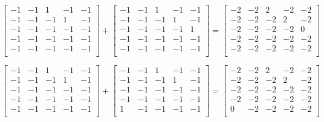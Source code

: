 \documentclass[IN,11pt,twoside,openright,bachelor,english]{tumthesis}
\begin{document}
\[
\begin{bmatrix}
-1 & -1 & 1 & -1 & -1 \\
-1 & -1 & -1 & 1 & -1 \\
-1 & -1 & -1 & -1 & -1 \\
-1 & -1 & -1 & -1 & -1 \\
-1 & -1 & -1 & -1 & -1 \\
\end{bmatrix}
+
\begin{bmatrix}
-1 & -1 & 1 & -1 & -1 \\
-1 & -1 & -1 & 1 & -1 \\
-1 & -1 & -1 & -1 & 1 \\
-1 & -1 & -1 & -1 & -1 \\
-1 & -1 & -1 & -1 & -1 \\
\end{bmatrix}
=
\begin{bmatrix}
-2 & -2 & 2 & -2 & -2 \\
-2 & -2 & -2 & 2 & -2 \\
-2 & -2 & -2 & -2 & 0 \\
-2 & -2 & -2 & -2 & -2 \\
-2 & -2 & -2 & -2 & -2 \\
\end{bmatrix}
\]




\[
\begin{bmatrix}
-1 & -1 & 1 & -1 & -1 \\
-1 & -1 & -1 & 1 & -1 \\
-1 & -1 & -1 & -1 & -1 \\
-1 & -1 & -1 & -1 & -1 \\
-1 & -1 & -1 & -1 & -1 \\
\end{bmatrix}
+
\begin{bmatrix}
-1 & -1 & 1 & -1 & -1 \\
-1 & -1 & -1 & 1 & -1 \\
-1 & -1 & -1 & -1 & -1 \\
-1 & -1 & -1 & -1 & -1 \\
1 & -1 & -1 & -1 & -1 \\
\end{bmatrix}
=
\begin{bmatrix}
-2 & -2 & 2 & -2 & -2 \\
-2 & -2 & -2 & 2 & -2 \\
-2 & -2 & -2 & -2 & -2 \\
-2 & -2 & -2 & -2 & -2 \\
0 & -2 & -2 & -2 & -2 \\
\end{bmatrix}
\]
\end{document}
